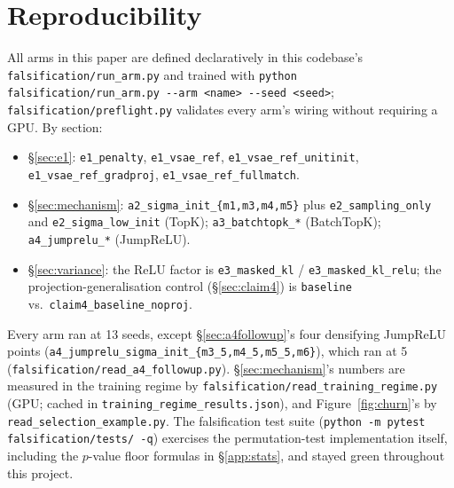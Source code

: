 \documentclass[11pt]{article}
\begin{document}
\section{Reproducibility}
\label{app:repro}

{\raggedright
All arms in this paper are defined declaratively in this codebase's
\texttt{falsification/run\_arm.py} and trained with
\texttt{python falsification/run\_arm.py -{}-arm <name> -{}-seed <seed>};
\texttt{falsification/preflight.py} validates every arm's wiring without
requiring a GPU. By section:
\begin{itemize}\raggedright
\item \S\ref{sec:e1}: \texttt{e1\_penalty}, \texttt{e1\_vsae\_ref},
  \texttt{e1\_vsae\_ref\_unitinit}, \texttt{e1\_vsae\_ref\_gradproj},
  \texttt{e1\_vsae\_ref\_fullmatch}.
\item \S\ref{sec:mechanism}: \texttt{a2\_sigma\_init\_\{m1,m3,m4,m5\}} plus
  \texttt{e2\_sampling\_only} and \texttt{e2\_sigma\_low\_init} (TopK);
  \texttt{a3\_batchtopk\_*} (BatchTopK); \texttt{a4\_jumprelu\_*} (JumpReLU).
\item \S\ref{sec:variance}: the ReLU factor is \texttt{e3\_masked\_kl} /
  \texttt{e3\_masked\_kl\_relu}; the projection-generalisation control
  (\S\ref{sec:claim4}) is \texttt{baseline} vs.\
  \texttt{claim4\_baseline\_noproj}.
\end{itemize}
Every arm ran at 13 seeds, except \S\ref{sec:a4followup}'s four densifying
JumpReLU points (\texttt{a4\_jumprelu\_sigma\_init\_\{m3\_5,m4\_5,m5\_5,m6\}}),
which ran at 5 (\texttt{falsification/read\_a4\_followup.py}).
\S\ref{sec:mechanism}'s numbers are measured in the training regime by
\texttt{falsification/read\_training\_regime.py} (GPU; cached in
\texttt{training\_regime\_results.json}), and Figure~\ref{fig:churn}'s by
\texttt{read\_selection\_example.py}. The
falsification test suite (\texttt{python -m pytest falsification/tests/ -q})
exercises the permutation-test implementation itself, including the
$p$-value floor formulas in \S\ref{app:stats}, and stayed green throughout
this project.\par}
\end{document}
